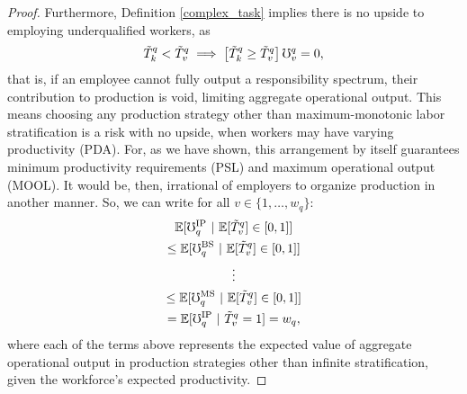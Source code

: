 \documentclass[hidelinks, nonatbib]{elsarticle}
\begin{document}
\begin{lemma}
\begin{proof}
        Furthermore, Definition \ref{complex_task} implies there is no upside to employing underqualified workers, as 
        \begin{gather}
            \tilde{T}_{k}^{q}
            <
            \tilde{T}_{v}^{q}
            \implies
            \left[
                \tilde{T}_{k}^{q}
                \geq
                \tilde{T}_{v}^{q}
            \right]
            \mho_{v}^{q}
            =
            0
            ,
        \end{gather}
        that is, if an employee cannot fully output a responsibility spectrum, their contribution to production is void, limiting aggregate operational output. This means choosing any production strategy other than maximum-monotonic labor stratification is a risk with no upside, when workers may have varying productivity (PDA). For, as we have shown, this arrangement by itself guarantees minimum productivity requirements (PSL) and maximum operational output (MOOL). It would be, then, irrational of employers to organize production in another manner. So, we can write for all $v \in \{1, \dots, w_q\}$:
        \begin{gather}
            \mathbb{E}[
                \mho_{q}^{\text{IP}}
                \
                |
                \
                \mathbb{E}[
                    \tilde{T}_{v}^{q}
                ]
                \in [0,1]
            ]
            \\
            \leq
            \mathbb{E}[
                \mho_{q}^{\text{BS}}
                \
                |
                \
                \mathbb{E}[
                    \tilde{T}_{v}^{q}
                ]
                \in [0,1]
            ]
            \\
            \vdots
            \\
            \leq
            \mathbb{E}[
                \mho_{q}^{\text{MS}}
                \
                |
                \
                \mathbb{E}[
                    \tilde{T}_{v}^{q}
                ]
                \in [0,1]
            ]
            \\
            =
            \mathbb{E}[
                \mho_{q}^{\text{IP}}
                \
                |
                \
                \tilde{T}_{v}^{q}
                = 1
            ]
            =
            w_q
            ,
        \end{gather}
        where each of the terms above represents the expected value of aggregate operational output in production strategies other than infinite stratification, given the workforce's expected productivity.


\end{proof}
\end{lemma}
\end{document}
